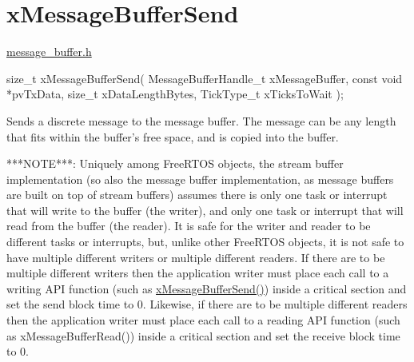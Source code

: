 \hypertarget{group__x_message_buffer_send}{}\section{x\+Message\+Buffer\+Send}
\label{group__x_message_buffer_send}
\mbox{\hyperlink{message__buffer_8h}{message\+\_\+buffer.\+h}}


\begin{DoxyPre}
size\_t xMessageBufferSend( MessageBufferHandle\_t xMessageBuffer,
                           const void *pvTxData,
                           size\_t xDataLengthBytes,
                           TickType\_t xTicksToWait );

\begin{DoxyPre}\end{DoxyPre}
\end{DoxyPre}



\begin{DoxyPre}
\begin{DoxyPre}   Sends a discrete message to the message buffer.  The message can be any
   length that fits within the buffer's free space, and is copied into the
   buffer.\end{DoxyPre}
\end{DoxyPre}



\begin{DoxyPre}
\begin{DoxyPre}   ***NOTE***:  Uniquely among FreeRTOS objects, the stream buffer
   implementation (so also the message buffer implementation, as message buffers
   are built on top of stream buffers) assumes there is only one task or
   interrupt that will write to the buffer (the writer), and only one task or
   interrupt that will read from the buffer (the reader).  It is safe for the
   writer and reader to be different tasks or interrupts, but, unlike other
   FreeRTOS objects, it is not safe to have multiple different writers or
   multiple different readers.  If there are to be multiple different writers
   then the application writer must place each call to a writing API function
   (such as \mbox{\hyperlink{message__buffer_8h_a858f6da6fe24a226c45caf1634ea1605}{xMessageBufferSend()}}) inside a critical section and set the send
   block time to 0.  Likewise, if there are to be multiple different readers
   then the application writer must place each call to a reading API function
   (such as xMessageBufferRead()) inside a critical section and set the receive
   block time to 0.\end{DoxyPre}
\end{DoxyPre}



